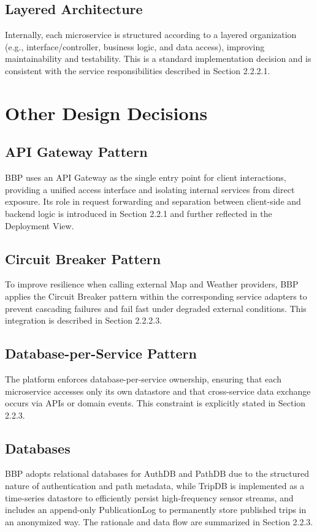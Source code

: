 \subsection{Layered Architecture}
Internally, each microservice is structured according to a layered organization (e.g., interface/controller, business logic, and data access), improving maintainability and testability. This is a standard implementation decision and is consistent with the service responsibilities described in Section 2.2.2.1.

\section{Other Design Decisions}

\subsection{API Gateway Pattern}
BBP uses an API Gateway as the single entry point for client interactions, providing a unified access interface and isolating internal services from direct exposure. Its role in request forwarding and separation between client-side and backend logic is introduced in Section 2.2.1 and further reflected in the Deployment View.

\subsection{Circuit Breaker Pattern}
To improve resilience when calling external Map and Weather providers, BBP applies the Circuit Breaker pattern within the corresponding service adapters to prevent cascading failures and fail fast under degraded external conditions. This integration is described in Section 2.2.2.3.

\subsection{Database-per-Service Pattern}
The platform enforces database-per-service ownership, ensuring that each microservice accesses only its own datastore and that cross-service data exchange occurs via APIs or domain events. This constraint is explicitly stated in Section 2.2.3.

\subsection{Databases}
BBP adopts relational databases for AuthDB and PathDB due to the structured nature of authentication and path metadata, while TripDB is implemented as a time-series datastore to efficiently persist high-frequency sensor streams, and includes an append-only PublicationLog to permanently store published trips in an anonymized way. The rationale and data flow are summarized in Section 2.2.3.




